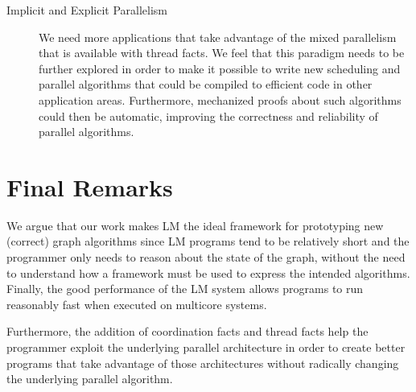 \begin{description}
\item[Implicit and Explicit Parallelism] We need more applications that take
   advantage of the mixed parallelism that is available with thread facts. We
   feel that this paradigm needs to be further explored in order to make it
   possible to write new scheduling and parallel algorithms that could be
   compiled to efficient code in other application areas. Furthermore,
   mechanized proofs about such algorithms could then be automatic, improving
   the correctness and reliability of parallel algorithms.

\end{description}

\section{Final Remarks}

We argue that our work makes LM the ideal framework for prototyping new
(correct) graph algorithms since LM programs tend to be relatively short and the
programmer only needs to reason about the state of the graph, without the need
to understand how a framework must be used to express the intended algorithms.
Finally, the good performance of the LM system allows programs to run reasonably
fast when executed on multicore systems.

Furthermore, the addition of coordination facts and thread facts help the
programmer exploit the underlying parallel architecture in order to create
better programs that take advantage of those architectures without radically
changing the underlying parallel algorithm.


